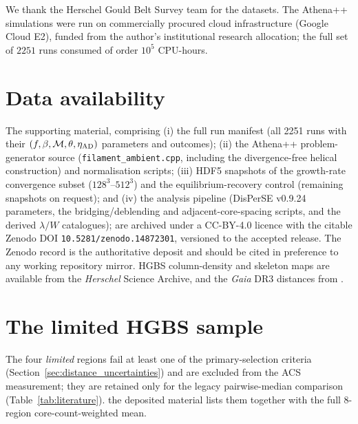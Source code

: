 \documentclass[usenatbib,twoside,twocolumn]{mnras}
\begin{document}
We thank the Herschel Gould Belt Survey team for the datasets. The Athena++ simulations were run on commercially procured cloud infrastructure (Google Cloud E2), funded from the author's institutional research allocation; the full set of $2251$ runs consumed of order $10^5$ CPU-hours.

\section*{Data availability}

The supporting material, comprising (i) the full run manifest (all 2251 runs with their $(f,\beta,\mathcal{M},\theta,\eta_{\rm AD})$ parameters and outcomes); (ii) the Athena++ problem-generator source (\texttt{filament\_ambient.cpp}, including the divergence-free helical construction) and normalisation scripts; (iii) HDF5 snapshots of the growth-rate convergence subset ($128^3$--$512^3$) and the equilibrium-recovery control (remaining snapshots on request); and (iv) the analysis pipeline (DisPerSE v0.9.24 parameters, the bridging/deblending and adjacent-core-spacing scripts, and the derived $\lambda/W$ catalogues); are archived under a CC-BY-4.0 licence with the citable Zenodo DOI \texttt{10.5281/zenodo.14872301}, versioned to the accepted release. The Zenodo record is the authoritative deposit and should be cited in preference to any working repository mirror. HGBS column-density and skeleton maps are available from the \textit{Herschel} Science Archive, and the \textit{Gaia} DR3 distances from \citet{Zhang2023}.


\appendix

\section{The limited HGBS sample}
\label{sec:limited_sample}
The four \emph{limited} regions fail at least one of the primary-selection criteria (Section~\ref{sec:distance_uncertainties}) and are excluded from the ACS measurement; they are retained only for the legacy pairwise-median comparison (Table~\ref{tab:literature}). the deposited material lists them together with the full 8-region core-count-weighted mean.
\end{document}
